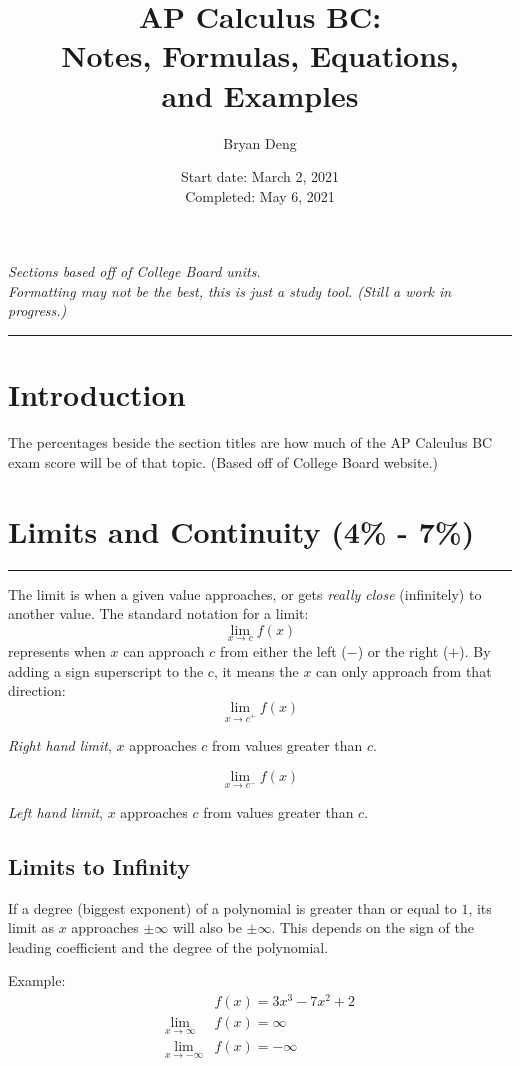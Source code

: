 \documentclass[12pt]{article}
\title{\textbf{AP Calculus BC:\\Notes, Formulas,  Equations,\\and Examples}}
\author{Bryan Deng}
\date{Start date: March 2, 2021\\Completed: May 6, 2021}
\newcommand{\fline}{\par\noindent\rule{\textwidth}{0.1pt}} %
\begin{document}
\maketitle
\vfill
\begin{center}
	\textit{Sections based off of College Board units.\\
		Formatting may not be the best, this is just a study tool. (Still a work in progress.)}
\end{center}
\newpage

\tableofcontents
\fline
\newpage

\section*{Introduction}
\indent The percentages beside the section titles are how much of the AP Calculus BC exam score will be of that topic. (Based off of College Board website.)

\section{Limits and Continuity (4\% - 7\%)}
\fline

The limit is when a given value approaches, or gets \textit{really close} (infinitely) to another value. The standard notation for a limit:
\[ \lim_{x \to c} f(x) \]
represents when $x$ can approach $c$ from either the left ($-$) or the right ($+$). By adding a sign superscript to the $c$, it means the $x$ can only approach from that direction:
\[ \lim_{x \to c^+} f(x) \]
\begin{center}
	\textit{Right hand limit}, $x$ approaches $c$ from values greater than $c$.
\end{center}
\[ \lim_{x \to c^-} f(x) \]
\begin{center}
	\textit{Left hand limit}, $x$ approaches $c$ from values greater than $c$.
\end{center}

\subsection{Limits to Infinity}

If a degree (biggest exponent) of a polynomial is greater than or equal to $1$, its limit as $x$ approaches $\pm\infty$ will also be $\pm\infty$. This depends on the sign of the leading coefficient and the degree of the polynomial.

\noindent Example:
\begin{align*}
	& f(x) = 3x^3 - 7x^2 + 2 \\
	\lim_{x \to \infty}  & f(x) = \infty          \\
	\lim_{x \to -\infty} & f(x) = -\infty
\end{align*}
\end{document}
